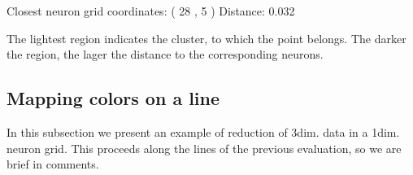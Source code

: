 \documentclass[letterpaper,10pt,english]{jupyterBook}
\begin{document}
\begin{sphinxVerbatim}[commandchars=\\\{\}]
Closest neuron grid coordinates: ( 28 , 5 )
Distance:  0.032
\end{sphinxVerbatim}

\noindent{}

\sphinxAtStartPar
The lightest region indicates the cluster, to which the point belongs. The darker the region, the lager the distance to the corresponding neurons.


\subsection{Mapping colors on a line}
\label{\detokenize{docs/som:mapping-colors-on-a-line}}
\sphinxAtStartPar
In this subsection we present an example of reduction of 3\sphinxhyphen{}dim. data in a 1\sphinxhyphen{}dim. neuron grid. This proceeds along the lines of the previous evaluation, so we are brief in comments.

\begin{sphinxVerbatim}[commandchars=\\\{\}]

\PYG{p}{[}\PYG{p}{[}\PYG{p}{]}    \PYG{p}{]}



   
    \PYG{p}{[}\PYG{p}{]} 
\end{sphinxVerbatim}
\end{document}

